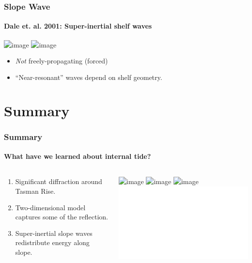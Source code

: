 \documentclass[aspectratio=169]{beamer}
\begin{document}
\begin{frame}
  \frametitle{Slope Wave}
  \framesubtitle{Dale et. al. 2001: Super-inertial shelf waves}
  \begin{center}
     \includegraphics<1>[width=0.5\textwidth]{./doc/daleetal01a.png} 
     \includegraphics<2>[width=0.5\textwidth]{./doc/ShelfWIdthConv.png} 
  \end{center}
  \begin{itemize}
    \item<1-> \emph{Not} freely-propagating (forced)
    \item<2> ``Near-resonant'' waves depend on shelf geometry.
  \end{itemize}
\end{frame}

\section{Summary}
\begin{frame}
  \frametitle{Summary}
  \framesubtitle{What have we learned about internal tide?}
  \begin{columns}
    \begin{column}{0.5\textwidth}
      \begin{enumerate}
        \item<1-> Significant diffraction around Tasman Rise.
        \item<2-> Two-dimensional model captures some of the reflection.
        \item<3-> Super-inertial slope waves redistribute energy along slope.
      \end{enumerate}
    \end{column}
    \begin{column}{0.5\textwidth}
      \includegraphics<1>[width=\textwidth]{doc/tasmanDiffract.png}
      \includegraphics<2>[width=\textwidth]{doc/MyKelly2.png}
      \includegraphics<3>[width=\textwidth]{doc/ShelfWIdthConv.png} 
      \includegraphics<4>[width=\textwidth]{doc/TwoWaves.pdf}
    \end{column}
    
  \end{columns}

\end{frame}
\end{document}
